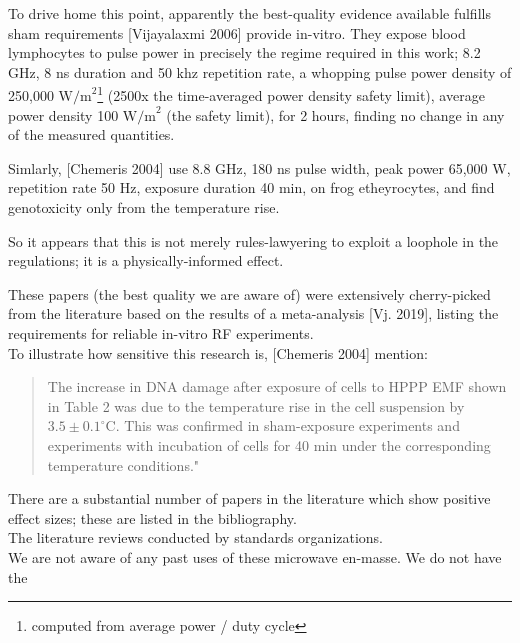 \documentclass[fleqn,10pt]{article}
\begin{document}
To drive home this point, apparently the best-quality evidence available fulfills sham requirements [Vijayalaxmi 2006] provide in-vitro. They expose blood lymphocytes to pulse power in precisely the regime required in this work; 8.2 GHz, 8 ns duration and 50 khz repetition rate, a whopping pulse power density of 250,000 $\text{W/m}^2$\footnote{computed from average power / duty cycle} (2500x the time-averaged power density safety limit), average power density 100 $\text{W/m}^2$ (the safety limit), for 2 hours, finding no change in any of the measured quantities. 

Simlarly, [Chemeris 2004] use 8.8 GHz, 180 ns pulse width, peak power 65,000 W, repetition rate 50 Hz, exposure duration 40 min, on frog etheyrocytes, and find genotoxicity only from the temperature rise.

So it appears that this is not merely rules-lawyering to exploit a loophole in the regulations; it is a physically-informed effect.

\begin{autem}

These papers (the best quality we are aware of) were extensively cherry-picked from the literature based on the results of a meta-analysis [Vj. 2019], listing the requirements for reliable in-vitro RF experiments.\\

To illustrate how sensitive this research is, [Chemeris 2004] mention:

\begin{quote}

The increase in DNA damage after exposure of cells to HPPP EMF shown in Table 2 was due to the temperature rise in the cell suspension by $3.5\pm0.1^{\circ}  $C. This was confirmed in sham-exposure experiments and experiments with incubation of cells for 40 min under the corresponding temperature conditions."

\end{quote}

There are a substantial number of papers in the literature which show positive effect sizes; these are listed in the bibliography. \\

The literature reviews conducted by standards organizations.\\

We are not aware of any past uses of these microwave en-masse. We do not have the 

\end{autem}
\end{document}
